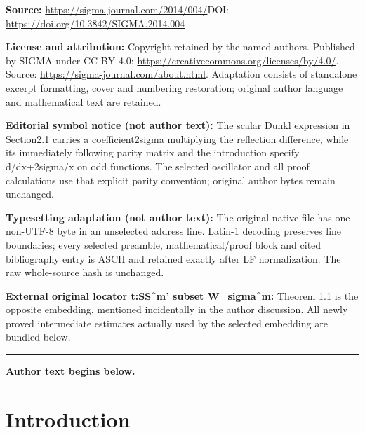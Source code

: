 \documentclass[11pt]{article}
\begin{document}
\noindent\textbf{Source:} \url{https://sigma-journal.com/2014/004/}\quad DOI: \url{https://doi.org/10.3842/SIGMA.2014.004}\par
\noindent\textbf{License and attribution:} Copyright retained by the named authors. Published by SIGMA under CC BY 4.0: \url{https://creativecommons.org/licenses/by/4.0/}. Source: \url{https://sigma-journal.com/about.html}. Adaptation consists of standalone excerpt formatting, cover and numbering restoration; original author language and mathematical text are retained.\par
\noindent\textbf{Editorial symbol notice (not author text):} The scalar Dunkl expression in Section2.1 carries a coefficient2sigma multiplying the reflection difference, while its immediately following parity matrix and the introduction specify d/dx+\allowbreak{}2sigma/x on odd functions. The selected oscillator and all proof calculations use that explicit parity convention; original author bytes remain unchanged.\par
\noindent\textbf{Typesetting adaptation (not author text):} The original native file has one non-UTF-8 byte in an unselected address line. Latin-1 decoding preserves line boundaries; every selected preamble, mathematical/proof block and cited bibliography entry is ASCII and retained exactly after LF normalization. The raw whole-source hash is unchanged.\par
\noindent\textbf{External original locator t:SS\textasciicircum{}m' subset W\_sigma\textasciicircum{}m:} Theorem 1.1 is the opposite embedding, mentioned incidentally in the author discussion. All newly proved intermediate estimates actually used by the selected embedding are bundled below.\par
\medskip\hrule\medskip\noindent\textbf{Author text begins below.}\par
\setcounter{section}{0}
\setcounter{subsection}{0}
\setcounter{subsubsection}{0}
\setcounter{Theorem}{0}
\setcounter{equation}{0}
\section{Introduction} \label{s:intro}
\end{document}
